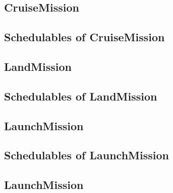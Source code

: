 \documentclass[10pt,a4paper]{article}
\begin{document}

\newpage


\subsection{CruiseMission}

\newpage

\subsection{Schedulables of CruiseMission}


\newpage


\newpage


\newpage


\subsection{LandMission}

\newpage

\subsection{Schedulables of LandMission}


\newpage


\newpage


\newpage


\subsection{LaunchMission}

\newpage

\subsection{Schedulables of LaunchMission}


\newpage


\subsection{LaunchMission}

\newpage
\end{document}
